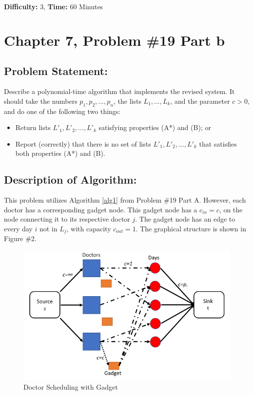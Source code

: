 \documentclass{article}
\begin{document}
\noindent \textbf{Difficulty:}  3, 
\textbf{Time:}  60 Minutes

\newpage

\section*{Chapter 7, Problem \#19 Part b}

\subsection*{Problem Statement:}  
Describe a polynomial-time algorithm that implements the revised system.  It should take the numbers $p_1, p_2, ..., p_n$, the lists $L_1, ..., L_k$, and the parameter $c > 0$, and do one of the following two things:

\begin{itemize}
	\item Return lists $L'_1, L'_2, ..., L'_k$ satisfying properties (A*) and (B); or
	\item Report (correctly) that there is no set of lists $L'_1, L'_2, ..., L'_k$ that satisfies both properties (A*) and (B).
\end{itemize}

\subsection*{Description of Algorithm:}
This problem utilizes Algorithm \ref{alg1} from Problem \#19 Part A.  However, each doctor has a corresponding gadget node.  This gadget node has a $c_{in} = c$, on the node connecting it to its respective doctor $j$.  The gadget node has an edge to every day $i$ not in $L_j$, with capacity $c_{out}=1$.  The graphical structure is shown in Figure \#2.

\begin{figure}[h!]
	\label{Fig_19b}
	\centering
	\includegraphics[scale=.6]{Images/19b_Flow.png}
	\caption*{
	\centering
	\footnotesize }
	\caption{Doctor Scheduling with Gadget}
\end{figure}
\end{document}
